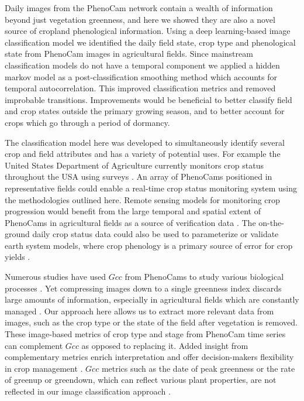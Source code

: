 \documentclass{article}
\begin{document}
Daily images from the PhenoCam network contain a wealth of information beyond just vegetation greenness, and here we showed they are also a novel source of cropland phenological information. Using a deep learning-based image classification model we identified the daily field state, crop type and phenological state from PhenoCam images in agricultural fields. Since mainstream classification models do not have a temporal component we applied a hidden markov model as a post-classification smoothing method which accounts for temporal autocorrelation. This improved classification metrics and removed improbable transitions. Improvements would be beneficial to better classify field and crop states outside the primary growing season, and to better account for crops which go through a period of dormancy. 

The classification model here was developed to simultaneously identify several crop and field attributes and has a variety of potential uses. For example the United States Department of Agriculture currently monitors crop status throughout the USA using surveys \citep{nass2012}. An array of PhenoCams positioned in representative fields could enable a real-time crop status monitoring system using the methodologies outlined here. Remote sensing models for monitoring crop progression would benefit from the large temporal and spatial extent of PhenoCams in agricultural fields as a source of verification data \citep{gao-zhang2021}. The on-the-ground  daily crop status data could also be used to parameterize or validate earth system models, where crop phenology is a primary source of error for crop yields \citep{lombardozzi2020}.  

Numerous studies have used $Gcc$ from PhenoCams to study various biological processes \citep{richardson2018b, richardson2019}. Yet compressing images down to a single greenness index discards large amounts of information, especially in agricultural fields which are constantly managed \citep{browning2021}. Our approach here allows us to extract more relevant data from images, such as the crop type or the state of the field after vegetation is removed. These image-based metrics of crop type and stage from PhenoCam time series can complement $Gcc$ as opposed to replacing it. Added insight from complementary metrics enrich interpretation and offer decision-makers flexibility in crop management \citep{browning2021}. $Gcc$ metrics such as the date of peak greenness or the rate of greenup or greendown, which can reflect various plant properties, are not reflected in our image classification approach \citep{aasen2020}. 
\end{document}
